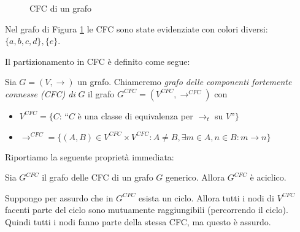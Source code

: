 \begin{example}
    \begin{figure}[b]
        \centering
        \caption{CFC di un grafo}
        \label{fig:graph_cfc_1}
    \end{figure}
    Nel grafo di Figura \ref*{fig:graph_cfc_1} le CFC sono state evidenziate con colori diversi: $\{a,b,c,d\}, \{e\}$.
\end{example}
Il partizionamento in CFC è definito come segue:
\begin{definition}
    Sia $G = (V, \to)$ un grafo. Chiameremo \emph{grafo delle componenti fortemente connesse (CFC) di} $G$ il grafo $G^{CFC} = (V^{CFC}, \to^{CFC})$ con
    \begin{itemize}
        \item $V^{CFC} = \{C : \,$``$C$ è una classe di equivalenza per $\to_t$ su $V$''$\}$
        \item $\to^{CFC} = \{(A,B) \in V^{CFC} \times V^{CFC} : A \neq B, \exists m \in A, n \in B : m \to n\}$
    \end{itemize}
\end{definition}
Riportiamo la seguente proprietà immediata:
\begin{proposition}
    Sia $G^{CFC}$ il grafo delle CFC di un grafo $G$ generico. Allora $G^{CFC}$ è aciclico.
\end{proposition}
\begin{proof2}
    Suppongo per assurdo che in $G^{CFC}$ esista un ciclo. Allora tutti i nodi di $V^{CFC}$ facenti parte del ciclo sono mutuamente raggiungibili (percorrendo il ciclo). Quindi tutti i nodi fanno parte della stessa CFC, ma questo è assurdo.
\end{proof2}
